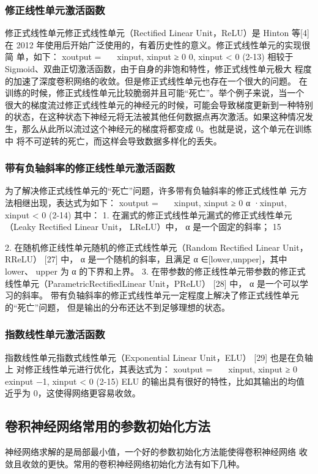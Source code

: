 \subsubsection{修正线性单元激活函数}
修正式线性单元修正式线性单元（Rectified Linear Unit，ReLU）是 Hinton 等[4] 在 2012 年使用后开始广泛使用的，有着历史性的意义。修正式线性单元的实现很简 单，如下： xoutput =   xinput, xinput ≥ 0 0, xinput < 0 (2-13) 相较于 Sigmoid、双曲正切激活函数，由于自身的非饱和特性，修正式线性单元极大 程度的加速了深度卷积网络的收敛。但是修正式线性单元也存在一个很大的问题。 在训练的时候，修正式线性单元比较脆弱并且可能“死亡”。举个例子来说，当一个 很大的梯度流过修正式线性单元的神经元的时候，可能会导致梯度更新到一种特别 的状态，在这种状态下神经元将无法被其他任何数据点再次激活。如果这种情况发 生，那么从此所以流过这个神经元的梯度将都变成 0。也就是说，这个单元在训练中 将不可逆转的死亡，而这样会导致数据多样化的丢失。
\subsubsection{带有负轴斜率的修正线性单元激活函数}
为了解决修正式线性单元的“死亡”问题，许多带有负轴斜率的修正式线性单 元方法相继出现，表达式为如下： xoutput =   xinput, xinput ≥ 0 α ·xinput, xinput < 0 (2-14) 其中：
1. 在漏式的修正式线性单元漏式的修正式线性单元（Leaky Rectified Linear Unit， LReLU）中， α 是一个固定的斜率；
15

2. 在随机修正线性单元随机的修正式线性单元（Random Rectified Linear Unit， RReLU） [27] 中， α 是一个随机的斜率，且满足 α ∈[lower,unpper]，其中 lower、 upper 为 α 的下界和上界。
3. 在带参数的修正线性单元带参数的修正式线性单元（ParametricRectifiedLinear Unit，PReLU） [28] 中， α 是一个可以学习的斜率。
带有负轴斜率的修正式线性单元一定程度上解决了修正式线性单元的“死亡”问题， 但是输出的分布还达不到足够理想的状态。

\subsubsection{指数线性单元激活函数}
指数线性单元指数式线性单元（Exponential Linear Unit，ELU） [29] 也是在负轴上 对修正线性单元进行优化，其表达式为： xoutput =   xinput, xinput ≥ 0 exinput −1, xinput < 0 (2-15) ELU 的输出具有很好的特性，比如其输出的均值近乎为 0，这使得网络更容易收敛。

\subsection{卷积神经网络常用的参数初始化方法}
神经网络求解的是局部最小值，一个好的参数初始化方法能使得卷积神经网络 收敛且收敛的更快。常用的卷积神经网络初始化方法有如下几种。

